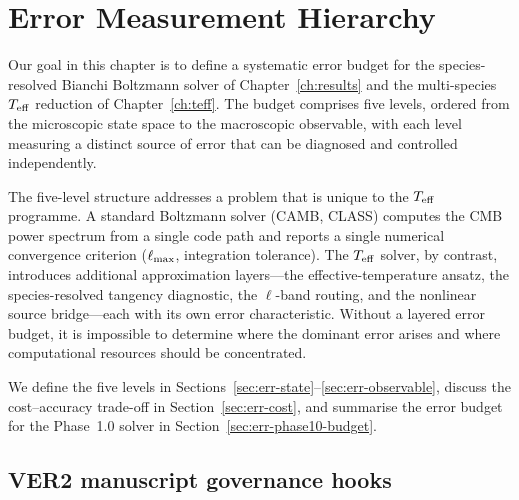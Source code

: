 
\chapter{Error Measurement Hierarchy}
\label{ch:error-hierarchy}

Our goal in this chapter is to define a systematic error
budget for the species-resolved Bianchi Boltzmann solver of
Chapter~\ref{ch:results} and the multi-species $T_{\mathrm{eff}}$
reduction of Chapter~\ref{ch:teff}.  The budget comprises five
levels, ordered from the microscopic state space to the
macroscopic observable, with each level measuring a distinct
source of error that can be diagnosed and controlled
independently.

The five-level structure addresses a problem that is unique to
the $T_{\mathrm{eff}}$ programme.  A standard Boltzmann solver (CAMB,
CLASS) computes the CMB power spectrum from a single code path
and reports a single numerical convergence criterion
($\ell_{\rm max}$, integration tolerance).  The $T_{\mathrm{eff}}$
solver, by contrast, introduces additional approximation
layers---the effective-temperature ansatz, the species-resolved
tangency diagnostic, the $\ell$-band routing, and the
nonlinear source bridge---each with its own error
characteristic.  Without a layered error budget, it is
impossible to determine where the dominant error arises and
where computational resources should be concentrated.

We define the five levels in
Sections~\ref{sec:err-state}--\ref{sec:err-observable},
discuss the cost--accuracy trade-off in
Section~\ref{sec:err-cost}, and summarise the error budget
for the Phase~1.0 solver in
Section~\ref{sec:err-phase10-budget}.


\section{VER2 manuscript governance hooks}
\label{sec:ver2-manuscript-governance}








